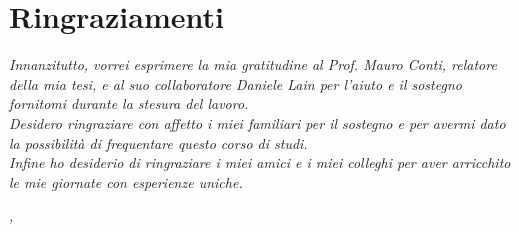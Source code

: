 
\cleardoublepage
{}
{}


\bigskip

\begingroup
\let\clearpage\relax
\let\cleardoublepage\relax
\let\cleardoublepage\relax

\chapter*{Ringraziamenti}

\noindent \textit{Innanzitutto, vorrei esprimere la mia gratitudine al Prof. Mauro Conti, relatore della mia tesi, e al suo collaboratore Daniele Lain per l'aiuto e il sostegno fornitomi durante la stesura del lavoro.}\\

\noindent \textit{Desidero ringraziare con affetto i miei familiari per il sostegno e per avermi dato la possibilità di frequentare questo corso di studi.}\\

\noindent \textit{Infine ho desiderio di ringraziare i miei amici e i miei colleghi per aver arricchito le mie giornate con esperienze uniche.}\\
\bigskip

\noindent\textit{\myLocation, \myTime}
\hfill \myName

\endgroup

